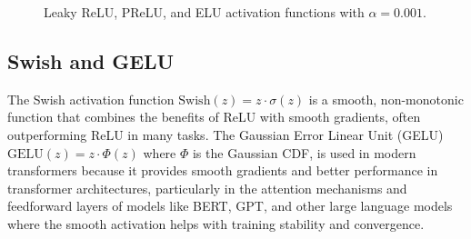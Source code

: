 \begin{figure}[htbp]
\caption{Leaky ReLU, PReLU, and ELU activation functions with $\alpha=0.001$.}
\label{fig:leaky-relu-variants}
\end{figure}

\subsection{Swish and GELU}

The Swish activation function $\text{Swish}(z) = z \cdot \sigma(z)$ is a smooth, non-monotonic function that combines the benefits of ReLU with smooth gradients, often outperforming ReLU in many tasks. The Gaussian Error Linear Unit (GELU) $\text{GELU}(z) = z \cdot \Phi(z)$ where $\Phi$ is the Gaussian CDF, is used in modern transformers because it provides smooth gradients and better performance in transformer architectures, particularly in the attention mechanisms and feedforward layers of models like BERT, GPT, and other large language models where the smooth activation helps with training stability and convergence.

